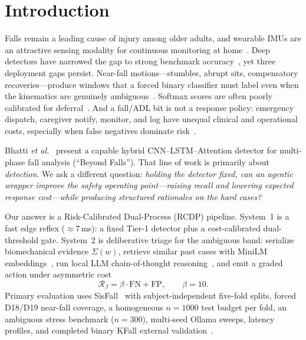 \documentclass[journal]{IEEEtran}
\begin{document}
\section{Introduction}
\label{sec:intro}

Falls remain a leading cause of injury among older adults, and wearable IMUs are an attractive sensing modality for continuous monitoring at home~\cite{iglesias2019wearable,nurek2020fallsurvey,khan2017review,sisfall2017}. Deep detectors have narrowed the gap to strong benchmark accuracy~\cite{ren2021survey}, yet three deployment gaps persist. Near-fall motions---stumbles, abrupt sits, compensatory recoveries---produce windows that a forced binary classifier must label even when the kinematics are genuinely ambiguous~\cite{aziz2016fall}. Softmax scores are often poorly calibrated for deferral~\cite{guo2017calibration,geifman2017selective,el2010foundations}. And a fall/ADL bit is not a response policy: emergency dispatch, caregiver notify, monitor, and log have unequal clinical and operational costs, especially when false negatives dominate risk~\cite{elkan2001foundations}.

Bhatti \textit{et al.}~\cite{bhatti2025beyond} present a capable hybrid CNN--LSTM--Attention detector for multi-phase fall analysis (``Beyond Falls''). That line of work is primarily about \emph{detection}. We ask a different question: \emph{holding the detector fixed, can an agentic wrapper improve the safety operating point---raising recall and lowering expected response cost---while producing structured rationales on the hard cases?}

Our answer is a Risk-Calibrated Dual-Process (RCDP) pipeline. System~1 is a fast edge reflex ($\approx 7$\,ms): a fixed Tier-1 detector plus a cost-calibrated dual-threshold gate. System~2 is deliberative triage for the ambiguous band: serialize biomechanical evidence $\Sigma(w)$, retrieve similar past cases with MiniLM embeddings~\cite{minilm2020,lewis2020rag}, run local LLM chain-of-thought reasoning~\cite{wei2022cot,yao2023react,ollama,mistral2023}, and emit a graded action under asymmetric cost
\begin{equation}
\mathcal{R}_\beta = \beta\cdot\mathrm{FN}+\mathrm{FP},\qquad \beta=10.
\label{eq:risk}
\end{equation}
Primary evaluation uses SisFall~\cite{sisfall2017} with subject-independent five-fold splits, forced D18/D19 near-fall coverage, a homogeneous $n{=}1000$ test budget per fold, an ambiguous stress benchmark ($n{=}300$), multi-seed Ollama sweeps, latency profiles, and completed binary KFall external validation~\cite{kfall2021}.
\end{document}
